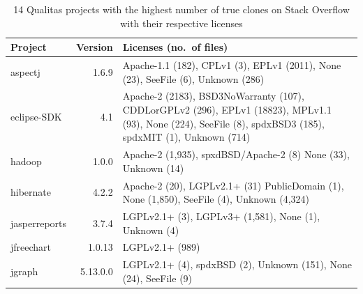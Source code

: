\documentclass[sigconf,review, anonymous]{acmart}
\begin{document}
\begin{table}
	\centering
	\caption{14 Qualitas projects with the highest number of true clones on Stack Overflow with their respective licenses}
	\label{t:q_projects_license}
	\small
	\begin{tabular}{l|r|p{4cm}}
		\hline 
		Project & Version & Licenses (no.~of files) \\
		\hline
		aspectj & 1.6.9 & Apache-1.1 (182), CPLv1 (3), \newline EPLv1 (2011), None (23), \newline SeeFile (6), Unknown (286) \\
		\hline
		eclipse-SDK &  4.1 & Apache-2 (2183), \newline BSD3NoWarranty (107), \newline CDDLorGPLv2 (296), \newline EPLv1 (18823), MPLv1.1 (93), \newline None (224), SeeFile (8), \newline spdxBSD3 (185), \newline spdxMIT (1), Unknown (714) \\
		\hline
		hadoop & 1.0.0 & Apache-2 (1,935), \newline spxdBSD/Apache-2 (8) \newline None (33), Unknown (14) \\
		\hline
		hibernate & 4.2.2 & Apache-2 (20), \newline LGPLv2.1+ (31) \newline PublicDomain (1), \newline None (1,850), SeeFile (4), \newline Unknown (4,324) \\
		\hline
		jasperreports & 3.7.4 & LGPLv2.1+ (3), \newline LGPLv3+ (1,581), \newline None (1), Unknown (4)\\
		\hline
		jfreechart & 1.0.13 & LGPLv2.1+ (989) \\
		\hline
		jgraph & 5.13.0.0 & LGPLv2.1+ (4), \newline spdxBSD (2), Unknown (151), \newline None (24), SeeFile (9) \\
		\hline

\end{tabular}
\end{table}
\end{document}
